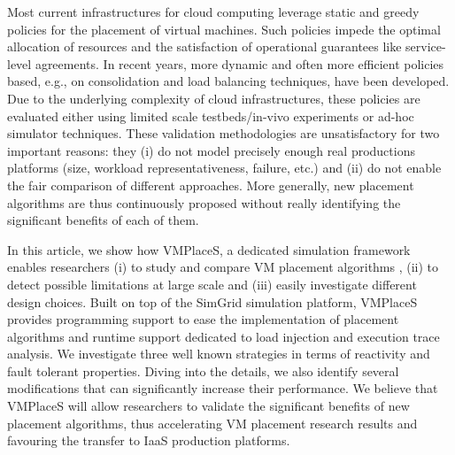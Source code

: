 
Most current infrastructures for cloud computing leverage static and
greedy policies for the placement of virtual machines. Such policies
impede the optimal allocation of resources and the satisfaction of
operational guarantees like service-level agreements. In recent years,
more dynamic and often more efficient policies based, e.g., on
consolidation and load balancing techniques, have been developed. Due
to the underlying complexity of cloud infrastructures, these policies
are evaluated either using limited scale testbeds/in-vivo experiments
or ad-hoc simulator techniques. These validation methodologies are
unsatisfactory for two important reasons: they (i) do not model
precisely enough real productions platforms (size, workload
representativeness, failure, etc.) and (ii) do not enable the fair
comparison of different approaches. More generally, new placement
algorithms are thus continuously proposed without really identifying
the significant benefits of each of them.

In this article, we show how VMPlaceS, a dedicated simulation
framework enables researchers (i) to study and compare VM placement
algorithms , (ii) to detect possible limitations at large scale and
(iii) easily investigate different design choices. Built on top of the
SimGrid simulation platform, VMPlaceS provides programming support to
ease the implementation of placement algorithms and runtime support
dedicated to load injection and execution trace analysis. We
investigate three well known strategies in terms of
reactivity and fault tolerant properties. Diving into the details, we
also identify several modifications that can significantly increase
their performance. We believe that VMPlaceS will allow researchers to
validate the significant benefits of new placement algorithms, thus
accelerating VM placement research results and favouring the transfer
to IaaS production platforms.


